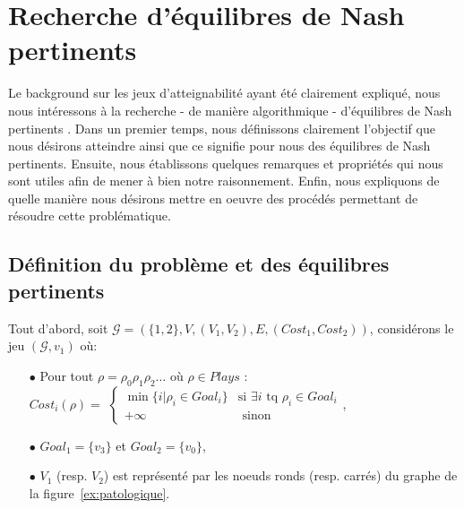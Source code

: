 
\section{Recherche d'équilibres de Nash pertinents}
\label{section:equilibrePert}

Le background sur les jeux d'atteignabilité ayant été clairement expliqué, nous nous intéressons à la recherche - de manière algorithmique - d'équilibres de Nash \og pertinents \fg. Dans un premier temps, nous définissons clairement l'objectif que nous désirons atteindre ainsi que ce signifie pour nous des équilibres de Nash pertinents. Ensuite, nous établissons quelques remarques et propriétés qui nous sont utiles afin de mener à bien notre raisonnement. Enfin, nous expliquons de quelle manière nous désirons mettre en oeuvre des procédés permettant de résoudre cette problématique.

\subsection{Définition du problème et des équilibres pertinents}

Tout d'abord, soit $\mathcal{G} = ( \{ 1,2 \}, V, (V_{1}, V_{2}),E, (Cost _{1},Cost _{2}))$, considérons le jeu $(\mathcal{G},v_{1})$ où:\begin{enumerate}
\item[$\bullet$] Pour tout  $\rho = \rho _{0} \rho _{1} \rho _{2} \ldots $ où $\rho \in Plays$ :\\$Cost_{i}(\rho) = $ $\begin{cases} 
								\min \{ i | \rho _{i} \in Goal_{i} \} & \text{si } \exists i \text{ tq } \rho _{i} \in Goal_{i} \\
								+\infty & \text{ sinon}
								\end{cases}$,
\item[$\bullet$] $Goal_{1} = \{ v_{3} \}$ et $Goal_{2} = \{ v_{0} \}$,
\item[$\bullet$]  $V_{1}$ (resp. $V_{2}$) est représenté par les noeuds ronds (resp. carrés) du graphe de la figure~\ref{ex:patologique}.

\end{enumerate}


